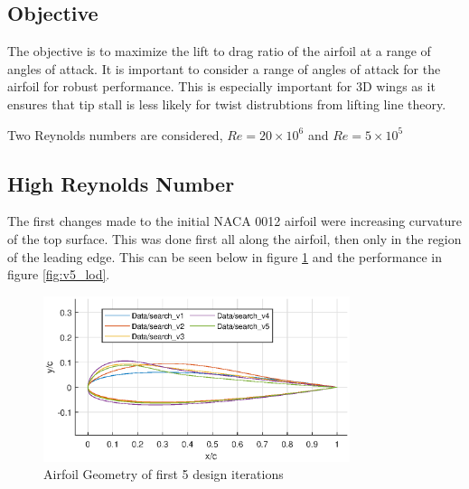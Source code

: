 \documentclass{article}
\begin{document}
\subsection{Objective}

The objective is to maximize the lift to drag ratio of the airfoil at a range of angles of attack.
It is important to consider a range of angles of attack for the airfoil for robust performance.
This is especially important for 3D wings as it ensures that tip stall is less likely for twist distrubtions from lifting line theory.

Two Reynolds numbers are considered, $Re = 20\times10^6$ and $Re = 5\times10^5$


\subsection{High Reynolds Number}

The first changes made to the initial NACA 0012 airfoil were increasing curvature of the top surface.
This was done first all along the airfoil, then only in the region of the leading edge.
This can be seen below in figure \ref{fig:v5_geometry} and the performance in figure \ref{fig:v5_lod}.

\begin{figure}[H]
    \centering
    \includegraphics[width=0.8\textwidth]{figures/hiRe_geometry_5.eps}
    \caption{Airfoil Geometry of first 5 design iterations}
    \label{fig:v5_geometry}
\end{figure}
\end{document}
